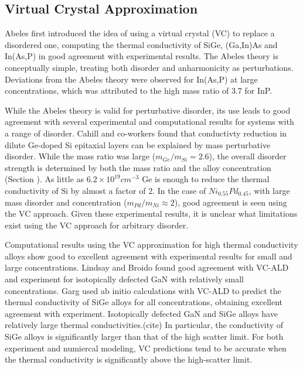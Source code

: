 \documentclass[aps,prb,twocolumn,superscriptaddress,amsmath,amssymb,floatfix]{revtex4}
\begin{document}
\subsection{\label{S:Virtual Crystal}Virtual Crystal Approximation}

Abeles first introduced the idea of using a virtual crystal (VC) to 
replace a disordered one, computing the
thermal conductivity of SiGe, (Ga,In)As and In(As,P) in good agreement 
with experimental results. The Abeles theory is conceptually simple,  
treating both
disorder and anharmonicity as perturbations.\cite{abeles_lattice_1963} 
Deviations from the Abeles theory 
were observed for In(As,P) at large concentrations, which was attributed 
to the high mass ratio of 3.7 for InP.
\cite{abeles_lattice_1963}

While the Abeles theory is valid for 
perturbative disorder, its use leads to good agreement with
several experimental and computational results for systems with 
a range of disorder. 
Cahill and co-workers found that conductivty reduction in dilute 
Ge-doped Si epitaxial layers 
can be explained by mass perturbative disorder.
\cite{cahill_thermal_2004,cahill_thermal_2005} 
While the mass ratio was large ($m_{Ge}/m_{Si} = 2.6$),  
the overall disorder strength is determined by both the mass ratio and 
the alloy concentration (Section ). 
As little as $6.2\times10^{19} cm^{-3}$ Ge  
is enough to reduce the thermal conductivity of 
Si by almost a factor of 2.\cite{cahill_thermal_2004}
In the
case of $Ni_{0.55}Pd_{0.45}$, with large mass disorder and 
concentration ($m_{Pd}/m_{Ni} \approx 2$), 
good agreement is seen using the VC approach.
\cite{kamitakahara_vibrations_1974} 
Given these experimental results, it is unclear what limitations exist 
using the VC approach for arbitrary disorder.

Computational results using the VC approximation 
for high thermal conductivity 
alloys show good to excellent agreement with experimental results for 
small and large concentrations.
\cite{garg_role_2011,lindsay_thermal_2012} 
Lindsay and Broido 
found good agreement with VC-ALD and experiment for 
isotopically defected GaN with relatively small concentrations.
\cite{lindsay_thermal_2012}  
Garg used ab initio calculations with VC-ALD   
to predict the thermal conductivity of SiGe alloys 
for all concentrations, obtaining excellent agreement with experiment.
\cite{garg_role_2011}  
Isotopically defected GaN and SiGe alloys have relatively large 
thermal conductivities.(cite) In 
particular, the conductivity of SiGe alloys is significantly 
larger than that of the high scatter limit.\cite{cahill_lattice_1988}  
For both experiment and numiercal modeling, VC predictions tend 
to be accurate when the thermal conductivity is significantly above 
the high-scatter limit.
\cite{abeles_lattice_1963,kamitakahara_vibrations_1974,
cahill_thermal_2004,cahill_thermal_2005,
cahill_lattice_1988,garg_role_2011,lindsay_thermal_2012} 
\end{document}
